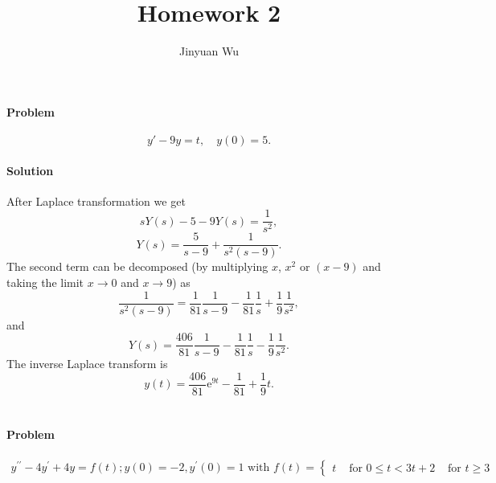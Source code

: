 \documentclass[hyperref, a4paper]{article}
\title{Homework 2}
\author{Jinyuan Wu}
\newcommand*{\ee}{\mathrm{e}}
\def\\{}%
\begin{document}
\maketitle

\section{}

\paragraph*{Problem} 
\begin{equation}
    y' - 9y = t, \quad y(0) = 5.
\end{equation}

\paragraph*{Solution} After Laplace transformation we get 
\[
    s Y(s) - 5 - 9 Y(s) = \frac{1}{s^2}, 
\]
\[
    Y(s) = \frac{5}{s - 9} + \frac{1}{s^2 (s - 9)}.
\]
The second term can be decomposed 
(by multiplying $x$, $x^2$ or $(x - 9)$ and taking the limit $x \to 0$ and $x \to 9$) as
\[
    \frac{1}{s^2 (s - 9)} = \frac{1}{81} \frac{1}{s - 9} 
    - \frac{1}{81} \frac{1}{s} 
    + \frac{1}{9}  \frac{1}{s^2}, 
\]
and 
\[
    Y(s) = \frac{406}{81} \frac{1}{s - 9} 
    - \frac{1}{81} \frac{1}{s} 
    - \frac{1}{9}  \frac{1}{s^2}. 
\]
The inverse Laplace transform is 
\begin{equation}
    y(t) = \frac{406}{81} \ee^{9t} - \frac{1}{81} + \frac{1}{9} t. 
\end{equation}

\section{}

\paragraph*{Problem} 
\[
    \begin{gathered}
        y^{\prime \prime}-4 y^{\prime}+4 y=f(t) ; y(0)=-2, y^{\prime}(0)=1 \text { with } \\
        f(t)= \begin{cases}t & \text { for } 0 \leq t<3 \\
        t+2 & \text { for } t \geq 3\end{cases}
    \end{gathered}
\]
\end{document}
